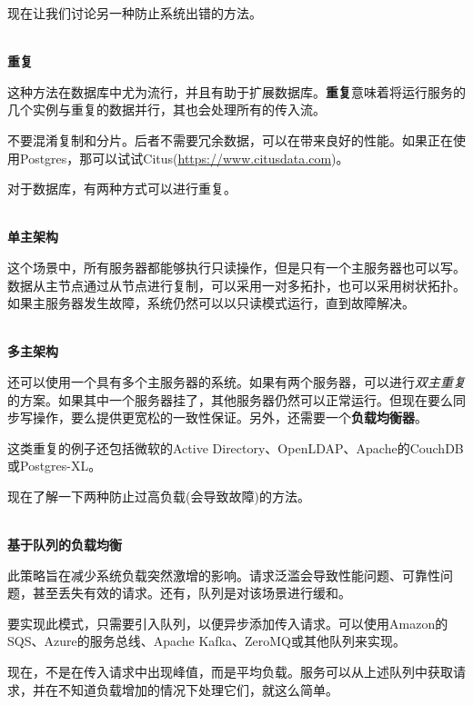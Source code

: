 现在让我们讨论另一种防止系统出错的方法。

\hspace*{\fill} \\ %
\noindent
\textbf{重复}

这种方法在数据库中尤为流行，并且有助于扩展数据库。\textbf{重复}意味着将运行服务的几个实例与重复的数据并行，其也会处理所有的传入流。

\begin{tcolorbox}[colback=blue!5!white,colframe=blue!75!black, title=Note]
\hspace*{0.75cm}不要混淆复制和分片。后者不需要冗余数据，可以在带来良好的性能。如果正在使用Postgres，那可以试试Citus(\url{https://www.citusdata.com})。
\end{tcolorbox}

对于数据库，有两种方式可以进行重复。

\hspace*{\fill} \\ %
\noindent
\textbf{单主架构}

这个场景中，所有服务器都能够执行只读操作，但是只有一个主服务器也可以写。数据从主节点通过从节点进行复制，可以采用一对多拓扑，也可以采用树状拓扑。如果主服务器发生故障，系统仍然可以以只读模式运行，直到故障解决。

\hspace*{\fill} \\ %
\noindent
\textbf{多主架构}

还可以使用一个具有多个主服务器的系统。如果有两个服务器，可以进行\textit{双主重复}的方案。如果其中一个服务器挂了，其他服务器仍然可以正常运行。但现在要么同步写操作，要么提供更宽松的一致性保证。另外，还需要一个\textbf{负载均衡器}。

这类重复的例子还包括微软的Active Directory、OpenLDAP、Apache的CouchDB或Postgres-XL。

现在了解一下两种防止过高负载(会导致故障)的方法。

\hspace*{\fill} \\ %
\noindent
\textbf{基于队列的负载均衡}

此策略旨在减少系统负载突然激增的影响。请求泛滥会导致性能问题、可靠性问题，甚至丢失有效的请求。还有，队列是对该场景进行缓和。

要实现此模式，只需要引入队列，以便异步添加传入请求。可以使用Amazon的SQS、Azure的服务总线、Apache Kafka、ZeroMQ或其他队列来实现。

现在，不是在传入请求中出现峰值，而是平均负载。服务可以从上述队列中获取请求，并在不知道负载增加的情况下处理它们，就这么简单。

